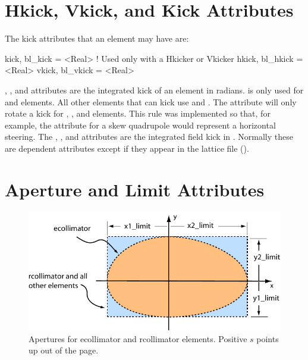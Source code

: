 \section{Hkick, Vkick, and Kick Attributes}
\label{s:kick}


The kick attributes that an element may have are:
\begin{example}
  kick,  bl_kick  = <Real>  ! Used only with a Hkicker or Vkicker
  hkick, bl_hkick = <Real>
  vkick, bl_vkick = <Real>
\end{example}
, , and  attributes are the integrated
kick of an element in radians.  is only used for 
and  elements. All other elements that can kick use
 and . The  attribute will only rotate a
kick for , ,  and 
elements. This rule was implemented so that, for example, the
 attribute for a skew quadrupole would represent a
horizontal steering. The , , and
 attributes are the integrated field kick in
. Normally these are dependent attributes except if
they appear in the lattice file ().

\section{Aperture and Limit Attributes}
\label{s:limit}

\begin{figure}[ht]
  \centering
  \includegraphics{apertures.pdf}
  \caption[Apertures for ecollimator and rcollimator elements.]
  {Apertures for ecollimator and rcollimator elements. 
  Positive $s$ points up out of the page.}
  \label{f:limit}
\end{figure}

